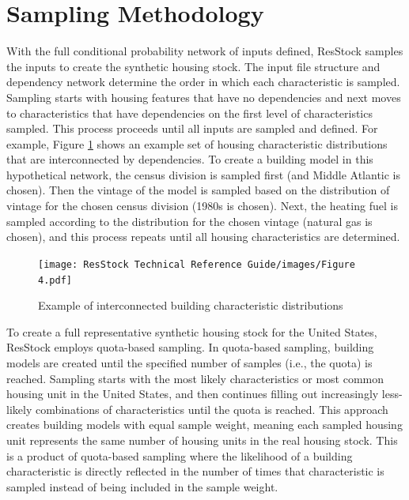 \section{Sampling Methodology} \label{sec:sampling_methodology}
 With the full conditional probability network of inputs defined, ResStock samples the inputs to create the synthetic housing stock. The input file structure and dependency network determine the order in which each characteristic is sampled. Sampling starts with housing features that have no dependencies and next moves to characteristics that have dependencies on the first level of characteristics sampled. This process proceeds until all inputs are sampled and defined. For example, Figure \ref{fig:ex_build_char_distrs} shows an example set of housing characteristic distributions that are interconnected by dependencies. To create a building model in this hypothetical network, the census division is sampled first (and Middle Atlantic is chosen). Then the vintage of the model is sampled based on the distribution of vintage for the chosen census division (1980s is chosen). Next, the heating fuel is sampled according to the distribution for the chosen vintage (natural gas is chosen), and this process repeats until all housing characteristics are determined.  

\begin{figure}
    \centering
    \texttt{[image: ResStock Technical Reference Guide/images/Figure 4.pdf]}
    \caption{Example of interconnected building characteristic distributions}
    \label{fig:ex_build_char_distrs}
\end{figure}

To create a full representative synthetic housing stock for the United States, ResStock employs quota-based sampling. In quota-based sampling, building models are created until the specified number of samples (i.e., the quota) is reached. Sampling starts with the most likely characteristics or most common housing unit in the United States, and then continues filling out increasingly less-likely combinations of characteristics until the quota is reached. This approach creates building models with equal sample weight, meaning each sampled housing unit represents the same number of housing units in the real housing stock. This is a product of quota-based sampling where the likelihood of a building characteristic is directly reflected in the number of times that characteristic is sampled instead of being included in the sample weight.

